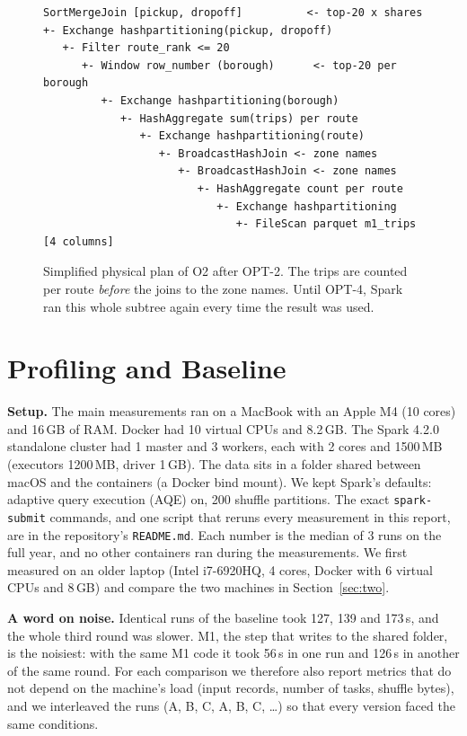 \documentclass[sigconf]{acmart}
\begin{document}
\begin{figure}[h]
\begin{scriptsize}
\begin{verbatim}
SortMergeJoin [pickup, dropoff]          <- top-20 x shares
+- Exchange hashpartitioning(pickup, dropoff)
   +- Filter route_rank <= 20
      +- Window row_number (borough)      <- top-20 per borough
         +- Exchange hashpartitioning(borough)
            +- HashAggregate sum(trips) per route
               +- Exchange hashpartitioning(route)
                  +- BroadcastHashJoin <- zone names
                     +- BroadcastHashJoin <- zone names
                        +- HashAggregate count per route
                           +- Exchange hashpartitioning
                              +- FileScan parquet m1_trips [4 columns]
\end{verbatim}
\end{scriptsize}
\caption{Simplified physical plan of O2 after OPT-2. The trips are counted per route \emph{before} the joins to
the zone names. Until OPT-4, Spark ran this whole subtree again every time the result was used.}
\label{fig:plan}
\end{figure}

\section{Profiling and Baseline}

\textbf{Setup.} The main measurements ran on a MacBook with an Apple M4 (10 cores) and 16\,GB of RAM. Docker had
10 virtual CPUs and 8.2\,GB. The Spark 4.2.0 standalone cluster had 1 master and 3 workers, each with 2 cores and
1500\,MB (executors 1200\,MB, driver 1\,GB). The data sits in a folder shared between macOS and the containers (a
Docker bind mount). We kept Spark's defaults: adaptive query execution (AQE) on, 200 shuffle partitions. The exact \texttt{spark-submit} commands, and one script that reruns every measurement in this report, are in the repository's \texttt{README.md}. Each
number is the median of 3 runs on the full year, and no other containers ran during the measurements. We first
measured on an older laptop (Intel i7-6920HQ, 4 cores, Docker with 6 virtual CPUs and 8\,GB) and compare the two
machines in Section~\ref{sec:two}.

\textbf{A word on noise.} Identical runs of the baseline took 127, 139 and 173\,s, and the whole third round was
slower. M1, the step that writes to the shared folder, is the noisiest: with the same M1 code it took 56\,s in one run
and 126\,s in another of the same round. For each comparison we therefore also report metrics that do not depend on the machine's
load (input records, number of tasks, shuffle bytes), and we interleaved the runs (A, B, C, A, B, C, \dots) so that
every version faced the same conditions.
\end{document}
